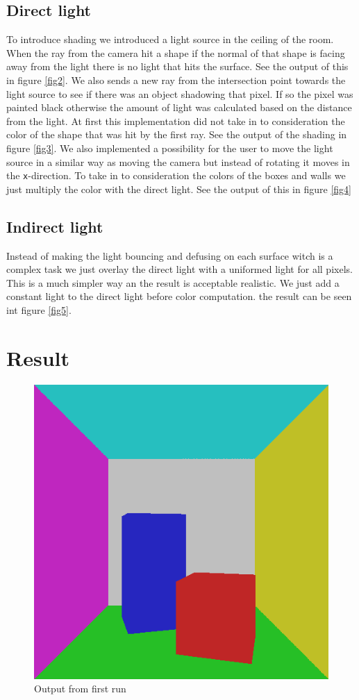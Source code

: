 \documentclass[a4paper,11pt]{article}
\begin{document}
\subsection{Direct light}
To introduce shading we introduced a light source in the ceiling of the room. When the ray from the camera hit a shape if the normal of that shape is facing away from the light there is no light that hits the surface. See the output of this in figure \ref{fig2}. We also sends a new ray from the intersection point towards the light source to see if there was an object shadowing that pixel. If so the pixel was painted black otherwise the amount of light was calculated based on the distance from the light. At first this implementation did not take in to consideration the color of the shape that was hit by the first ray. See the output of the shading in figure \ref{fig3}.
We also implemented a possibility for the user to move the light source in a similar way as moving the camera but instead of rotating it moves in the \verb|x|-direction.
To take in to consideration the colors of the boxes and walls we just multiply the color with the direct light. See the output of this in figure \ref{fig4}

\subsection{Indirect light}
Instead of making the light bouncing and defusing on each surface witch is a complex task we just overlay the direct light with a uniformed light for all pixels. This is a much simpler way an the result is acceptable realistic. We just add a constant light to the direct light before color computation. the result can be seen int figure \ref{fig5}. 
\section{Result}

\begin{figure}[h!]
	\centering	
	\includegraphics[width=0.45\linewidth]{screenshot1.png}
	\caption{Output from first run}
	\label{fig1}
\end{figure}
\end{document}
